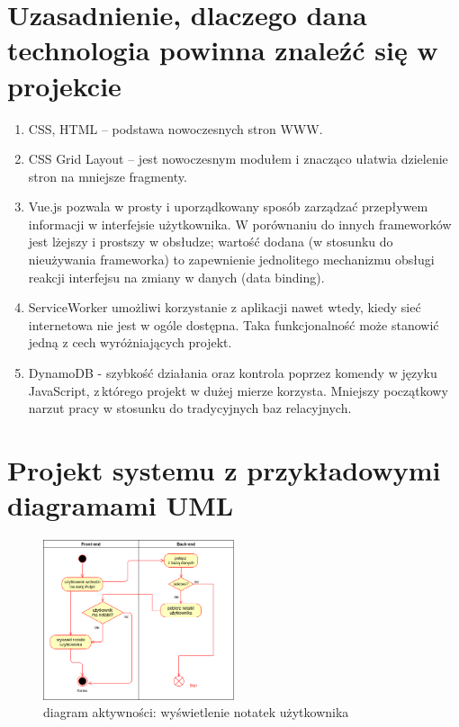 \documentclass[a4paper,11pt]{article}
\begin{document}
  \section{Uzasadnienie, dlaczego dana technologia powinna znaleźć się w\,projekcie}
  \begin{enumerate}
    \item CSS, HTML -- podstawa nowoczesnych stron WWW.
    \item CSS Grid Layout -- jest nowoczesnym modułem i znacząco ułatwia dzielenie stron na mniejsze fragmenty.
    \item Vue.js pozwala w prosty i uporządkowany sposób zarządzać przepływem informacji w interfejsie użytkownika. W porównaniu do innych frameworków jest lżejszy i prostszy w obsłudze; wartość dodana (w stosunku do nieużywania frameworka) to zapewnienie jednolitego mechanizmu obsługi reakcji interfejsu na zmiany w danych (data binding).
    \item ServiceWorker umożliwi korzystanie z aplikacji nawet wtedy, kiedy sieć internetowa nie jest w ogóle dostępna. Taka funkcjonalność może stanowić jedną z cech wyróżniających projekt. 
    \item DynamoDB - szybkość działania oraz kontrola poprzez komendy w języku JavaScript, z\,którego projekt w dużej mierze korzysta. Mniejszy początkowy narzut pracy w stosunku do tradycyjnych baz relacyjnych. 
  \end{enumerate}

  \section{Projekt systemu z przykładowymi diagramami UML}

  \begin{figure}[h!]
    \begin{center}
      \includegraphics[width=0.5\textwidth]{../diagramy/diagram_stanow_1.png}
    \end{center}
    \caption{diagram aktywności: wyświetlenie notatek użytkownika}
  \end{figure}
\end{document}
